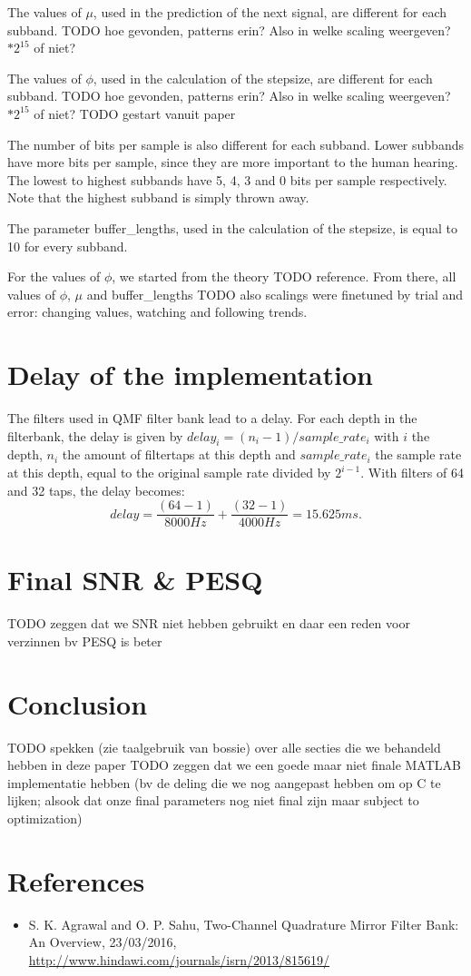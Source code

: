 \documentclass[a4paper]{article}
\begin{document}
The values of $\mu$, used in the prediction of the next signal, are different for each subband. TODO hoe gevonden, patterns erin? Also in welke scaling weergeven? $*2^15$ of niet?

The values of $\phi$, used in the calculation of the stepsize, are different for each subband. TODO hoe gevonden, patterns erin? Also in welke scaling weergeven? $*2^15$ of niet? TODO gestart vanuit paper

The number of bits per sample is also different for each subband. Lower subbands have more bits per sample, since they are more important to the human hearing. The lowest to highest subbands have 5, 4, 3 and 0 bits per sample respectively. Note that the highest subband is simply thrown away.

The parameter buffer\_lengths, used in the calculation of the stepsize, is equal to 10 for every subband.

For the values of $\phi$, we started from the theory TODO reference. From there, all values of $\phi$, $\mu$ and buffer\_lengths TODO also scalings were finetuned by trial and error: changing values, watching and following trends.

\section{Delay of the implementation}
The filters used in QMF filter bank lead to a delay. For each depth in the filterbank, the delay is given by $delay_i = (n_i-1) / sample\_rate_i$ with $i$ the depth, $n_i$ the amount of filtertaps at this depth and $sample\_rate_i$ the sample rate at this depth, equal to the original sample rate divided by $2^{i-1}$. With filters of 64 and 32 taps, the delay becomes:
\begin{equation*}
delay = \frac{(64-1)}{8000 Hz} + \frac{(32-1)}{4000 Hz} = 15.625 ms.
\end{equation*}

\section{Final SNR \& PESQ}
TODO zeggen dat we SNR niet hebben gebruikt en daar een reden voor verzinnen bv PESQ is beter

\section{Conclusion}
TODO spekken (zie taalgebruik van bossie) over alle secties die we behandeld hebben in deze paper
TODO zeggen dat we een goede maar niet finale MATLAB implementatie hebben (bv de deling die we nog aangepast hebben om op C te lijken; alsook dat onze final parameters nog niet final zijn maar subject to optimization)

\section{References}
\begin{itemize}
\item S. K. Agrawal and O. P. Sahu, Two-Channel Quadrature Mirror Filter Bank: An Overview, 23/03/2016, \url{http://www.hindawi.com/journals/isrn/2013/815619/}
\end{itemize}
\end{document}
